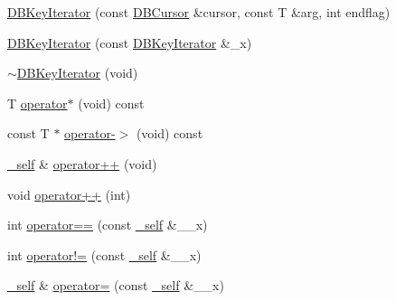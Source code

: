 \begin{DoxyCompactItemize}
\mbox{\hyperlink{classFILEDB_1_1DBKeyIterator_a7dc82bdde4a77bcadd704a3e87f6534a}{D\+B\+Key\+Iterator}} (const \mbox{\hyperlink{classFILEDB_1_1DBCursor}{D\+B\+Cursor}} \&cursor, const T \&arg, int endflag)
\item 
\mbox{\hyperlink{classFILEDB_1_1DBKeyIterator_ac1fa531110379c3deb566758095e8a0e}{D\+B\+Key\+Iterator}} (const \mbox{\hyperlink{classFILEDB_1_1DBKeyIterator}{D\+B\+Key\+Iterator}} \&\+\_\+x)
\item 
\mbox{\hyperlink{classFILEDB_1_1DBKeyIterator_a54300ef8000ed2910c47d931ee091113}{$\sim$\+D\+B\+Key\+Iterator}} (void)
\item 
T \mbox{\hyperlink{classFILEDB_1_1DBKeyIterator_ab3cfba3f2b19b6eb74ff614c62195ab4}{operator$\ast$}} (void) const
\item 
const T $\ast$ \mbox{\hyperlink{classFILEDB_1_1DBKeyIterator_a453e5281ba078f217558d44c049c564c}{operator-\/$>$}} (void) const
\item 
\mbox{\hyperlink{classFILEDB_1_1DBKeyIterator_aaf7773c7a848ec6e04bc738dd794ace1}{\+\_\+self}} \& \mbox{\hyperlink{classFILEDB_1_1DBKeyIterator_a7816155cac741f3f82dafa73028f4307}{operator++}} (void)
\item 
void \mbox{\hyperlink{classFILEDB_1_1DBKeyIterator_a364ac0414da6888e0b981f07b3239257}{operator++}} (int)
\item 
int \mbox{\hyperlink{classFILEDB_1_1DBKeyIterator_ab6d1aad1d07c4ee9a1edeadf6610c6f4}{operator==}} (const \mbox{\hyperlink{classFILEDB_1_1DBKeyIterator_aaf7773c7a848ec6e04bc738dd794ace1}{\+\_\+self}} \&\+\_\+\+\_\+x)
\item 
int \mbox{\hyperlink{classFILEDB_1_1DBKeyIterator_aa92d51bde395e8c546d9cbe1c65ef5e1}{operator!=}} (const \mbox{\hyperlink{classFILEDB_1_1DBKeyIterator_aaf7773c7a848ec6e04bc738dd794ace1}{\+\_\+self}} \&\+\_\+\+\_\+x)
\item 
\mbox{\hyperlink{classFILEDB_1_1DBKeyIterator_aaf7773c7a848ec6e04bc738dd794ace1}{\+\_\+self}} \& \mbox{\hyperlink{classFILEDB_1_1DBKeyIterator_adfa49c128d637dae0263553529126575}{operator=}} (const \mbox{\hyperlink{classFILEDB_1_1DBKeyIterator_aaf7773c7a848ec6e04bc738dd794ace1}{\+\_\+self}} \&\+\_\+\+\_\+x)
\end{DoxyCompactItemize}

